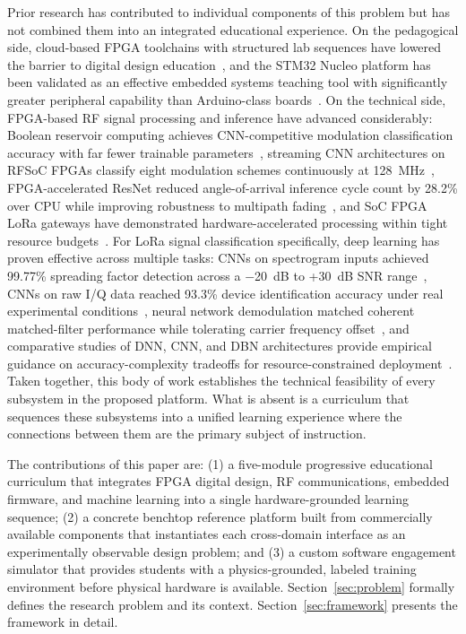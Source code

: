 \documentclass[conference]{IEEEtran}
\begin{document}
Prior research has contributed to individual components of this problem but has not combined them into an integrated educational experience. On the pedagogical side, cloud-based FPGA toolchains with structured lab sequences have lowered the barrier to digital design education~\cite{b9}, and the STM32 Nucleo platform has been validated as an effective embedded systems teaching tool with significantly greater peripheral capability than Arduino-class boards~\cite{b10}. On the technical side, FPGA-based RF signal processing and inference have advanced considerably: Boolean reservoir computing achieves CNN-competitive modulation classification accuracy with far fewer trainable parameters~\cite{b1}, streaming CNN architectures on RFSoC FPGAs classify eight modulation schemes continuously at 128~MHz~\cite{b3}, FPGA-accelerated ResNet reduced angle-of-arrival inference cycle count by 28.2\% over CPU while improving robustness to multipath fading~\cite{b2}, and SoC FPGA LoRa gateways have demonstrated hardware-accelerated processing within tight resource budgets~\cite{b7}. For LoRa signal classification specifically, deep learning has proven effective across multiple tasks: CNNs on spectrogram inputs achieved 99.77\% spreading factor detection across a $-$20~dB to +30~dB SNR range~\cite{b5}, CNNs on raw I/Q data reached 93.3\% device identification accuracy under real experimental conditions~\cite{b6}, neural network demodulation matched coherent matched-filter performance while tolerating carrier frequency offset~\cite{b8}, and comparative studies of DNN, CNN, and DBN architectures provide empirical guidance on accuracy-complexity tradeoffs for resource-constrained deployment~\cite{b4}. Taken together, this body of work establishes the technical feasibility of every subsystem in the proposed platform. What is absent is a curriculum that sequences these subsystems into a unified learning experience where the connections between them are the primary subject of instruction.

The contributions of this paper are: (1) a five-module progressive educational curriculum that integrates FPGA digital design, RF communications, embedded firmware, and machine learning into a single hardware-grounded learning sequence; (2) a concrete benchtop reference platform built from commercially available components that instantiates each cross-domain interface as an experimentally observable design problem; and (3) a custom software engagement simulator that provides students with a physics-grounded, labeled training environment before physical hardware is available. Section~\ref{sec:problem} formally defines the research problem and its context. Section~\ref{sec:framework} presents the framework in detail.
\end{document}
